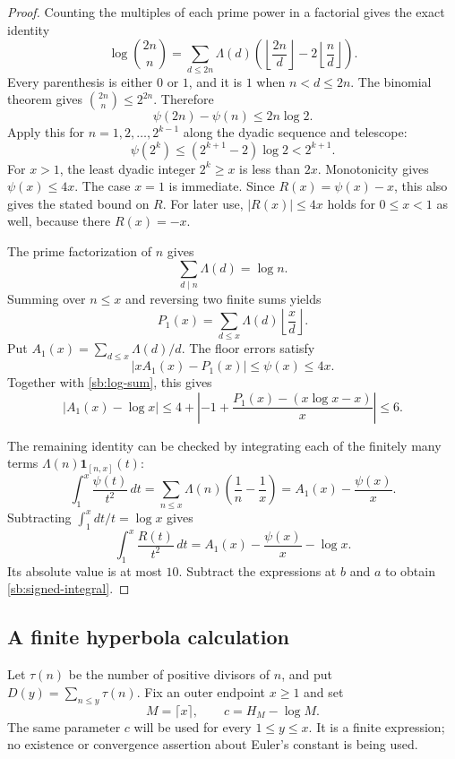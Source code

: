 \begin{proof}
Counting the multiples of each prime power in a factorial gives the exact
identity
\[
 \log\binom{2n}{n}
  =\sum_{d\le2n}\Lambda(d)
       \left(\left\lfloor\frac{2n}{d}\right\rfloor
              -2\left\lfloor\frac nd\right\rfloor\right).
\]
Every parenthesis is either $0$ or $1$, and it is $1$ when $n<d\le2n$.
The binomial theorem gives $\binom{2n}{n}\le2^{2n}$.  Therefore
\[
 \psi(2n)-\psi(n)\le2n\log2.
\]
Apply this for $n=1,2,\ldots,2^{k-1}$ along the dyadic sequence and
telescope:
\[
 \psi(2^k)\le(2^{k+1}-2)\log2<2^{k+1}.
\]
For $x>1$, the least dyadic integer $2^k\ge x$ is less than $2x$.
Monotonicity gives $\psi(x)\le4x$.  The case $x=1$ is immediate.
Since $R(x)=\psi(x)-x$, this also gives the stated bound on $R$.
For later use, $|R(x)|\le4x$ holds for $0\le x<1$ as well, because
there $R(x)=-x$.

The prime factorization of $n$ gives
\[
 \sum_{d\mid n}\Lambda(d)=\log n.
\]
Summing over $n\le x$ and reversing two finite sums yields
\[
 P_1(x)=\sum_{d\le x}\Lambda(d)
                      \left\lfloor\frac xd\right\rfloor.
\]
Put $A_1(x)=\sum_{d\le x}\Lambda(d)/d$.  The floor errors satisfy
\[
 |xA_1(x)-P_1(x)|\le\psi(x)\le4x.
\]
Together with \eqref{sb:log-sum}, this gives
\[
 |A_1(x)-\log x|
 \le4+\left|-1+\frac{P_1(x)-(x\log x-x)}x\right|
 \le6.
\]

The remaining identity can be checked by integrating each of the finitely
many terms $\Lambda(n)\mathbf1_{[n,x]}(t)$:
\[
 \int_1^x\frac{\psi(t)}{t^2}\,dt
     =\sum_{n\le x}\Lambda(n)\left(\frac1n-\frac1x\right)
     =A_1(x)-\frac{\psi(x)}x.
\]
Subtracting $\int_1^x dt/t=\log x$ gives
\[
 \int_1^x\frac{R(t)}{t^2}\,dt
     =A_1(x)-\frac{\psi(x)}x-\log x.
\]
Its absolute value is at most $10$.  Subtract the expressions at $b$
and $a$ to obtain \eqref{sb:signed-integral}.
\end{proof}

\subsection{A finite hyperbola calculation}
\label{sb:hyperbola}

Let $\tau(n)$ be the number of positive divisors of $n$, and put
$D(y)=\sum_{n\le y}\tau(n)$.  Fix an outer endpoint $x\ge1$ and set
\begin{equation}
 M=\lceil x\rceil,\qquad c=H_M-\log M.
 \label{sb:finite-c}
\end{equation}
The same parameter $c$ will be used for every $1\le y\le x$.
It is a finite expression; no existence or convergence assertion about
Euler's constant is being used.

